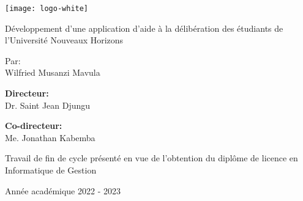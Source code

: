 \begin{center}

    \texttt{[image: logo-white]}

    \vspace{2cm}
    \Large{Développement d'une application d'aide à la délibération des étudiants de l'Université Nouveaux Horizons}

    \vspace{2cm}
    Par: \\
    Wilfried Musanzi Mavula

    \vspace{2cm}
    \textbf{Directeur:} \\
    Dr. Saint Jean Djungu

    \vspace{1cm}
    \textbf{Co-directeur:} \\
    Me. Jonathan Kabemba

    \vspace{2cm}
    Travail de fin de cycle présenté en vue de l'obtention du diplôme de licence en Informatique de Gestion

    \vspace{3cm}
    Année académique 2022 - 2023






    


    
\end{center}




